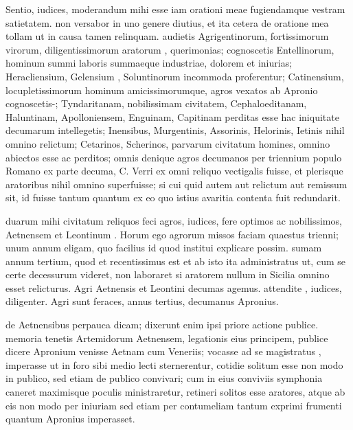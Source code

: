  Sentio, iudices, moderandum mihi esse iam orationi meae fugiendamque vestram satietatem. non versabor in uno genere diutius, et ita cetera de oratione mea tollam ut in causa tamen relinquam. audietis Agrigentinorum, fortissimorum virorum, diligentissimorum aratorum , querimonias; cognoscetis Entellinorum, hominum summi laboris summaeque industriae, dolorem et iniurias; Heracliensium, Gelensium , Soluntinorum incommoda proferentur; Catinensium, locupletissimorum hominum amicissimorumque, agros vexatos ab Apronio cognoscetis-; Tyndaritanam, nobilissimam civitatem, Cephaloeditanam, Haluntinam, Apolloniensem, Enguinam, Capitinam perditas esse hac iniquitate decumarum intellegetis; Inensibus, Murgentinis, Assorinis, Helorinis, Ietinis nihil omnino relictum; Cetarinos, Scherinos, parvarum civitatum homines, omnino abiectos esse ac perditos; omnis denique agros decumanos per triennium populo Romano ex parte decuma, C. Verri ex omni reliquo vectigalis fuisse, et plerisque aratoribus nihil omnino superfuisse; si cui quid autem aut relictum aut remissum sit, id fuisse tantum quantum ex eo quo istius avaritia contenta fuit redundarit.

 duarum mihi civitatum reliquos feci agros, iudices, fere optimos ac nobilissimos, Aetnensem et Leontinum . Horum ego agrorum missos faciam quaestus trienni; unum annum eligam, quo facilius id quod institui explicare possim. sumam annum tertium, quod et recentissimus est et ab isto ita administratus ut, cum se certe decessurum videret, non laboraret si aratorem nullum in Sicilia omnino esset relicturus. Agri Aetnensis et Leontini decumas agemus. attendite , iudices, diligenter. Agri sunt feraces, annus tertius, decumanus Apronius.

 de Aetnensibus perpauca dicam; dixerunt enim ipsi priore actione publice. memoria tenetis Artemidorum Aetnensem, legationis eius principem, publice dicere Apronium venisse Aetnam cum Veneriis; vocasse ad se magistratus , imperasse ut in foro sibi medio lecti sternerentur, cotidie solitum esse non modo in publico, sed etiam de publico convivari; cum in eius conviviis symphonia caneret maximisque poculis ministraretur, retineri solitos esse aratores, atque ab eis non modo per iniuriam sed etiam per contumeliam tantum exprimi frumenti quantum Apronius imperasset.

